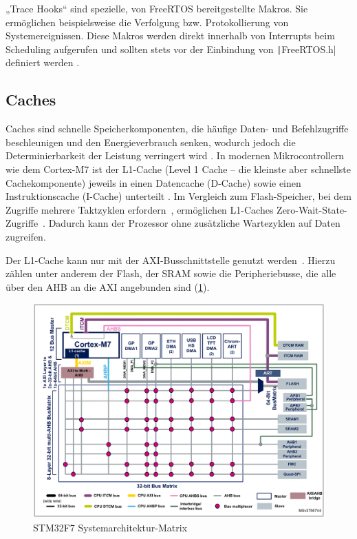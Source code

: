 „Trace Hooks“ sind spezielle, von FreeRTOS bereitgestellte Makros. Sie
ermöglichen beispielsweise die Verfolgung bzw. Protokollierung von
Systemereignissen. Diese Makros werden direkt innerhalb von Interrupts beim
Scheduling aufgerufen und sollten stets vor der Einbindung von
\texttt|FreeRTOS.h| definiert werden \cite{freertos_rtos_trace_hooks}.

\subsection{Caches}

Caches sind schnelle Speicherkomponenten, die häufige Daten- und Befehlzugriffe
beschleunigen und den Energieverbrauch senken, wodurch jedoch die
Determinierbarkeit der Leistung verringert wird \cite{ka001150}. In modernen
Mikrocontrollern wie dem Cortex-M7 ist der L1-Cache (Level 1 Cache -- die
kleinste aber schnellste Cachekomponente) jeweils in einen Datencache (D-Cache)
sowie einen Instruktionscache (I-Cache) unterteilt \cite[S. 6]{an4667}. Im
Vergleich zum Flash-Speicher, bei dem Zugriffe mehrere Taktzyklen
erfordern~\cite{stm32_memory_sections}, ermöglichen L1-Caches
Zero-Wait-State-Zugriffe~\cite[S. 6]{an4667}. Dadurch kann der Prozessor ohne
zusätzliche Wartezyklen auf Daten zugreifen.

Der L1-Cache kann nur mit der \ac{AXI}-Busschnittstelle genutzt werden~\cite[S.
4]{an4839}. Hierzu zählen unter anderem der Flash, der \ac{SRAM} sowie die
Peripheriebusse, die alle über den \ac{AHB} an die AXI angebunden sind
(\ref{fig:m7_sys_arch}).

\begin{figure}[htb]
    \centering
    \includegraphics[width=1\textwidth]{assets/m7_system_arch}
    \caption{STM32F7 Systemarchitektur-Matrix \cite[S. 9]{an4667}}
    \label{fig:m7_sys_arch}
\end{figure}

